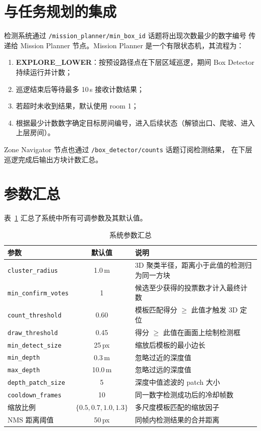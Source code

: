 \documentclass[12pt,a4paper]{article}
\begin{document}
\section{与任务规划的集成}

检测系统通过 \texttt{/mission\_planner/min\_box\_id} 话题将出现次数最少的数字编号
传递给 Mission Planner 节点。Mission Planner 是一个有限状态机，其流程为：

\begin{enumerate}[label=\arabic*.]
  \item \textbf{EXPLORE\_LOWER}：按预设路径点在下层区域巡逻，期间 Box Detector 持续运行并计数；
  \item 巡逻结束后等待最多 10\,s 接收计数结果；
  \item 若超时未收到结果，默认使用 room 1；
  \item 根据最少计数数字确定目标房间编号，进入后续状态（解锁出口、爬坡、进入上层房间）。
\end{enumerate}

Zone Navigator 节点也通过 \texttt{/box\_detector/counts} 话题订阅检测结果，
在下层巡逻完成后输出方块计数汇总。

\section{参数汇总}

表~\ref{tab:all_params} 汇总了系统中所有可调参数及其默认值。

\begin{table}[H]
\centering
\caption{系统参数汇总}
\label{tab:all_params}
\begin{tabular}{@{}lcp{7.5cm}@{}}
\toprule
\textbf{参数} & \textbf{默认值} & \textbf{说明} \\
\midrule
\texttt{cluster\_radius} & 1.0\,m & 3D 聚类半径，距离小于此值的检测归为同一方块 \\
\texttt{min\_confirm\_votes} & 1 & 候选至少获得的投票数才计入最终计数 \\
\texttt{count\_threshold} & 0.60 & 模板匹配得分 $\geq$ 此值才触发 3D 定位 \\
\texttt{draw\_threshold} & 0.45 & 得分 $\geq$ 此值在画面上绘制检测框 \\
\texttt{min\_detect\_size} & 25\,px & 缩放后模板的最小边长 \\
\texttt{min\_depth} & 0.3\,m & 忽略过近的深度值 \\
\texttt{max\_depth} & 10.0\,m & 忽略过远的深度值 \\
\texttt{depth\_patch\_size} & 5 & 深度中值滤波的 patch 大小 \\
\texttt{cooldown\_frames} & 10 & 同一数字检测成功后的冷却帧数 \\
缩放比例 & $\{0.5, 0.7, 1.0, 1.3\}$ & 多尺度模板匹配的缩放因子 \\
NMS 距离阈值 & 50\,px & 同帧内检测结果的合并距离 \\
\bottomrule
\end{tabular}
\end{table}
\end{document}
